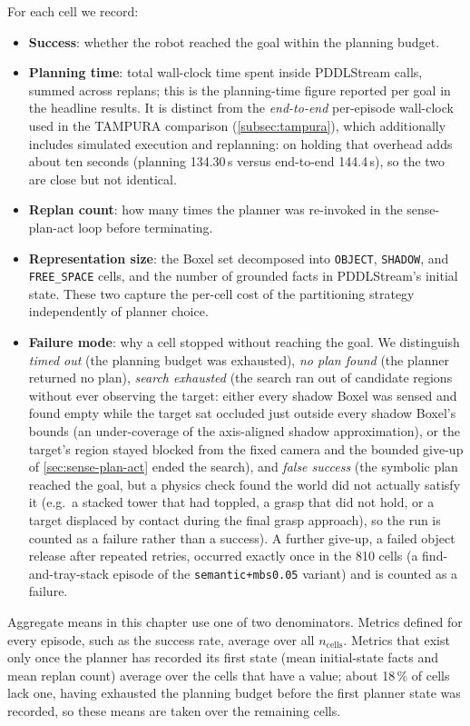 For each cell we record:
\begin{itemize}
    \item \textbf{Success}: whether the robot reached the goal within the planning budget.
    \item \textbf{Planning time}: total wall-clock time spent inside PDDLStream calls, summed across replans; this is the planning-time figure reported per goal in the headline results. It is distinct from the \emph{end-to-end} per-episode wall-clock used in the TAMPURA comparison (\cref{subsec:tampura}), which additionally includes simulated execution and replanning: on holding that overhead adds about ten seconds (planning 134.30\,s versus end-to-end 144.4\,s), so the two are close but not identical.
    \item \textbf{Replan count}: how many times the planner was re-invoked in the sense-plan-act loop before terminating.
    \item \textbf{Representation size}: the Boxel set decomposed into \texttt{OBJECT}, \texttt{SHADOW}, and \texttt{FREE\_SPACE} cells, and the number of grounded facts in PDDLStream's initial state. These two capture the per-cell cost of the partitioning strategy independently of planner choice.
    \item \textbf{Failure mode}: why a cell stopped without reaching the goal. We distinguish \emph{timed out} (the planning budget was exhausted), \emph{no plan found} (the planner returned no plan), \emph{search exhausted} (the search ran out of candidate regions without ever observing the target: either every shadow Boxel was sensed and found empty while the target sat occluded just outside every shadow Boxel's bounds (an under-coverage of the axis-aligned shadow approximation), or the target's region stayed blocked from the fixed camera and the bounded give-up of \cref{sec:sense-plan-act} ended the search), and \emph{false success} (the symbolic plan reached the goal, but a physics check found the world did not actually satisfy it (e.g.\ a stacked tower that had toppled, a grasp that did not hold, or a target displaced by contact during the final grasp approach), so the run is counted as a failure rather than a success). A further give-up, a failed object release after repeated retries, occurred exactly once in the 810 cells (a find-and-tray-stack episode of the \texttt{semantic+mbs0.05} variant) and is counted as a failure.
\end{itemize}
Aggregate means in this chapter use one of two denominators. Metrics defined for every episode, such as the success rate, average over all $n_\text{cells}$. Metrics that exist only once the planner has recorded its first state (mean initial-state facts and mean replan count) average over the cells that have a value; about 18\,\% of cells lack one, having exhausted the planning budget before the first planner state was recorded, so these means are taken over the remaining cells.

